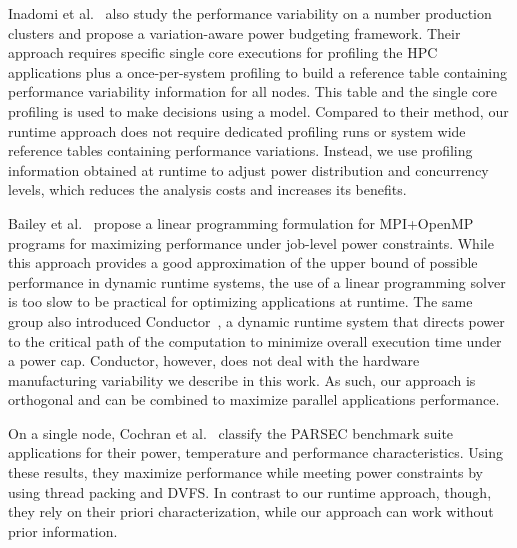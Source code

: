 Inadomi et al.~\cite{Inadomi:2015:AMI:2807591.2807638} also study the performance variability on a number production clusters and propose a variation-aware power budgeting framework.
Their approach requires specific single core executions for profiling the HPC applications plus a once-per-system profiling to build a reference table containing performance variability information for all nodes.
This table and the single core profiling is used to make decisions using a model. 
Compared to their method, our runtime approach does not require dedicated profiling runs or 
system wide reference tables containing performance variations.  Instead, we use profiling
information obtained at runtime to adjust power distribution and concurrency levels, 
which reduces the analysis costs and increases its benefits.

Bailey et al.~\cite{Bailey:2015:FLP:2807591.2807637} propose a linear programming formulation for MPI+OpenMP programs for maximizing performance under job-level power constraints. While this approach provides a good approximation of the upper bound of possible performance in dynamic runtime systems, the use of a linear programming solver is too slow to be practical for optimizing applications at runtime.
The same group also introduced Conductor~\cite{conductor2015}, a dynamic runtime system that directs power to the critical path of the computation to minimize overall execution time under a power cap. Conductor, however, does not  
deal with the hardware manufacturing variability we describe in this work.
As such, our approach is orthogonal and can be combined to maximize parallel applications performance.

On a single node, Cochran et al.~\cite{Cochran:2011:PCA:2155620.2155641} classify the PARSEC benchmark suite applications for their power, temperature and performance characteristics. Using these results, they maximize performance while meeting power constraints by
using thread packing and DVFS. In contrast to our runtime approach, though, they rely on their priori characterization, while our approach can work without prior information.
%

